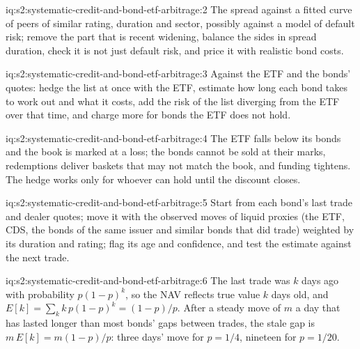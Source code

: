 \begin{solution}{iq:s2:systematic-credit-and-bond-etf-arbitrage:2}
The spread against a fitted curve of peers of similar rating, duration and sector, possibly against a model of default risk; remove the part that is
recent widening, balance the sides in spread duration, check it is not just default risk, and price it with realistic bond costs.
\end{solution}

\begin{solution}{iq:s2:systematic-credit-and-bond-etf-arbitrage:3}
Against the ETF and the bonds' quotes: hedge the list at once with the ETF, estimate how long each bond takes to work out and what it costs, add the
risk of the list diverging from the ETF over that time, and charge more for bonds the ETF does not hold.
\end{solution}

\begin{solution}{iq:s2:systematic-credit-and-bond-etf-arbitrage:4}
The ETF falls below its bonds and the book is marked at a loss; the bonds cannot be sold at their marks, redemptions deliver baskets that may not
match the book, and funding tightens. The hedge works only for whoever can hold until the discount closes.
\end{solution}

\begin{solution}{iq:s2:systematic-credit-and-bond-etf-arbitrage:5}
Start from each bond's last trade and dealer quotes; move it with the observed moves of liquid proxies (the ETF, CDS, the bonds of the same issuer
and similar bonds that did trade) weighted by its duration and rating; flag its age and confidence, and test the estimate against the next trade.
\end{solution}

\begin{solution}{iq:s2:systematic-credit-and-bond-etf-arbitrage:6}
The last trade was $k$ days ago with probability $p(1-p)^k$, so the NAV reflects true value $k$ days old, and $E[k] = \sum_k k\, p(1-p)^k =
(1-p)/p$. After a steady move of $m$ a day that has lasted longer than most bonds' gaps between trades, the stale gap is $m\,E[k] = m(1-p)/p$:
three days' move for $p = 1/4$, nineteen for $p = 1/20$.
\end{solution}
